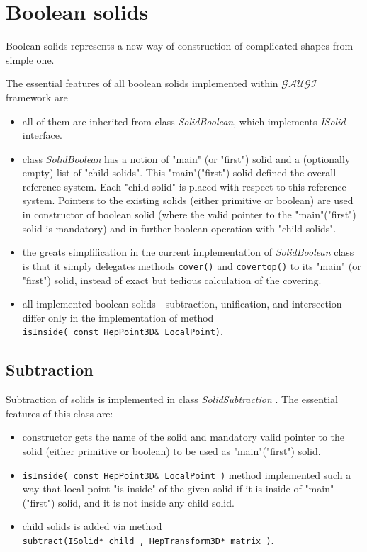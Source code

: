  \section{ Boolean  solids } 

   Boolean solids represents a new way of construction of complicated shapes from simple one. 
   
   The essential features of all boolean solids implemented within ${\mathcal{GAUGI}}$ framework are
\begin{itemize}
 \item all of them are inherited from class {\it SolidBoolean}, which implements {\it ISolid}  interface. 
 \item class {\it SolidBoolean}  has a notion of "main" (or "first") solid and a (optionally empty) list of 
 "child solids". This "main"("first") solid defined the overall reference system. Each "child solid" is placed 
 with respect to this reference system. Pointers to the existing solids (either primitive or boolean) are used 
 in constructor of boolean solid (where the valid pointer to the "main"("first") solid is mandatory) and in 
 further boolean operation with "child solids".
 \item the greats simplification in the current implementation of {\it SolidBoolean} class is that it simply 
 delegates methods \verb+cover()+ and \verb+covertop()+ to its "main" (or "first") solid, instead of 
 exact but tedious calculation of the covering.
 \item all implemented boolean solids - subtraction, unification, and intersection differ only in the implementation of 
method \\ \verb+isInside( const HepPoint3D& LocalPoint)+.
\end{itemize} 

 \subsection { Subtraction } 
Subtraction of solids is implemented in class {\it SolidSubtraction }. 
The essential features of this class are:
\begin{itemize}
 \item constructor gets the name of the solid and mandatory valid pointer to the solid (either primitive or boolean)
to be used as "main"("first") solid. 
 \item \verb+isInside( const HepPoint3D& LocalPoint )+ method implemented such a way 
that local point "is inside" of the given solid if it is inside of "main"("first")  solid, and it is not inside 
any child solid. 
\item child solids is added via method \\  \verb+subtract(ISolid* child , HepTransform3D* matrix )+. 
\end{itemize}   

